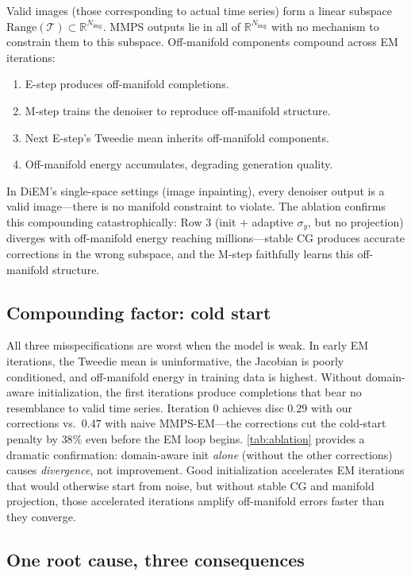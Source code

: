 \documentclass{article}
\theoremstyle{plain}
\theoremstyle{definition}
\theoremstyle{remark}
\newcommand{\tsimg}{\mathcal{T}}
\newcommand{\Nimg}{N_{\mathrm{img}}}
\begin{document}
Valid images (those corresponding to actual time series) form a linear subspace $\mathrm{Range}(\tsimg) \subset \mathbb{R}^{\Nimg}$. MMPS outputs lie in all of $\mathbb{R}^{\Nimg}$ with no mechanism to constrain them to this subspace. Off-manifold components compound across EM iterations:
\begin{enumerate}
\setlength{\itemsep}{0pt}
\item E-step produces off-manifold completions.
\item M-step trains the denoiser to reproduce off-manifold structure.
\item Next E-step's Tweedie mean inherits off-manifold components.
\item Off-manifold energy accumulates, degrading generation quality.
\end{enumerate}
In DiEM's single-space settings (image inpainting), every denoiser output is a valid image---there is no manifold constraint to violate. The ablation confirms this compounding catastrophically: Row $3$ (init $+$ adaptive $\sigma_y$, but no projection) diverges with off-manifold energy reaching millions---stable CG produces accurate corrections in the wrong subspace, and the M-step faithfully learns this off-manifold structure.

\subsection{Compounding factor: cold start}
\label{app:cold-start}

All three misspecifications are worst when the model is weak. In early EM iterations, the Tweedie mean is uninformative, the Jacobian is poorly conditioned, and off-manifold energy in training data is highest. Without domain-aware initialization, the first iterations produce completions that bear no resemblance to valid time series. Iteration $0$ achieves disc $0.29$ with our corrections vs.\ $0.47$ with naive MMPS-EM---the corrections cut the cold-start penalty by $38\%$ even before the EM loop begins. \cref{tab:ablation} provides a dramatic confirmation: domain-aware init \emph{alone} (without the other corrections) causes \emph{divergence}, not improvement. Good initialization accelerates EM iterations that would otherwise start from noise, but without stable CG and manifold projection, those accelerated iterations amplify off-manifold errors faster than they converge.

\subsection{One root cause, three consequences}
\end{document}
